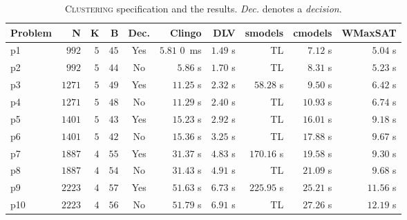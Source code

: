 \documentclass[]{article}
\begin{document}
\begin{table}[h]
\caption{\textsc{Clustering} specification and the results. \textit{Dec.} denotes a \textit{decision}.}
\label{tab:clustering_results}
\vspace{1em}
\scriptsize
\centering
\begin{tabular}{lrrrcrrrrr}
\toprule
Problem & N & K & B & Dec. & Clingo & DLV & smodels & cmodels & WMaxSAT \\
\midrule
p1 & $ 992 $ & $ 5 $ & $ 45 $ & Yes & $ 5.81 $ \SI{0}{ms} & $ \mathbf{1.49} $ s & TL & $ 7.12 $ s & $ 5.04 $ s \\
p2 & $ 992 $ & $ 5 $ & $ 44 $ & No & $ 5.86 $ s & $ \mathbf{1.70} $ s & TL & $ 8.31 $ s & $ 5.23 $ s \\
p3 & $ 1271 $ & $ 5 $ & $ 49 $ & Yes & $ 11.25 $ s & $ \mathbf{2.32} $ s & $ 58.28 $ s & $ 9.50 $ s & $ 6.42 $ s \\
p4 & $ 1271 $ & $ 5 $ & $ 48 $ & No & $ 11.29 $ s & $ \mathbf{2.40} $ s & TL & $ 10.93 $ s & $ 6.74 $ s \\
p5 & $ 1401 $ & $ 5 $ & $ 43 $ & Yes & $ 15.23 $ s & $ \mathbf{2.92} $ s & TL & $ 16.01 $ s & $ 9.18 $ s \\
p6 & $ 1401 $ & $ 5 $ & $ 42 $ & No & $ 15.36 $ s & $ \mathbf{3.25} $ s & TL & $ 17.88 $ s & $ 9.67 $ s \\
p7 & $ 1887 $ & $ 4 $ & $ 55 $ & Yes & $ 31.37 $ s & $ \mathbf{4.83} $ s & $ 170.16 $ s & $ 19.58 $ s & $ 9.30 $ s \\
p8 & $ 1887 $ & $ 4 $ & $ 54 $ & No & $ 31.43 $ s & $ \mathbf{4.91} $ s & TL & $ 21.09 $ s & $ 9.68 $ s \\
p9 & $ 2223 $ & $ 4 $ & $ 57 $ & Yes & $ 51.63 $ s & $ \mathbf{6.73} $ s & $ 225.95 $ s & $ 25.21 $ s & $ 11.56 $ s \\
p10 & $ 2223 $ & $ 4 $ & $ 56 $ & No & $ 51.79 $ s & $ \mathbf{6.91} $ s & TL & $ 27.26 $ s & $ 12.19 $ s \\
\bottomrule
\end{tabular}
\end{table}
\end{document}
